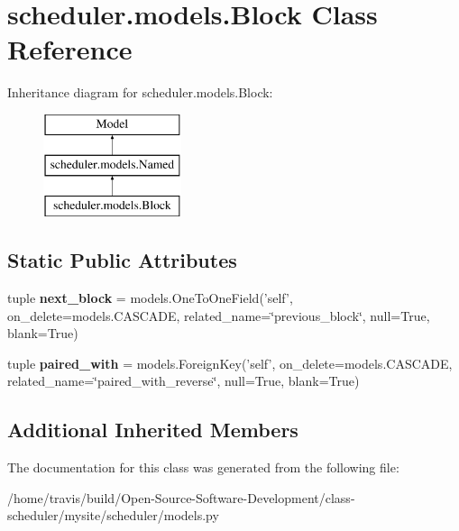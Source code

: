 \hypertarget{classscheduler_1_1models_1_1_block}{\section{scheduler.\-models.\-Block Class Reference}
\label{classscheduler_1_1models_1_1_block}
}
Inheritance diagram for scheduler.\-models.\-Block\-:\begin{figure}[H]
\begin{center}
\leavevmode
\includegraphics[height=3.000000cm]{classscheduler_1_1models_1_1_block}
\end{center}
\end{figure}
\subsection*{Static Public Attributes}
\begin{DoxyCompactItemize}
\item 
\hypertarget{classscheduler_1_1models_1_1_block_ab78204367b89bd16c9cb000d6bc8ecc6}{tuple {\bfseries next\-\_\-block} = models.\-One\-To\-One\-Field('self', on\-\_\-delete=models.\-C\-A\-S\-C\-A\-D\-E, related\-\_\-name=\char`\"{}previous\-\_\-block\char`\"{}, null=True, blank=True)}\label{classscheduler_1_1models_1_1_block_ab78204367b89bd16c9cb000d6bc8ecc6}

\item 
\hypertarget{classscheduler_1_1models_1_1_block_aa869281bbcdb191ddc5c0ed335e63109}{tuple {\bfseries paired\-\_\-with} = models.\-Foreign\-Key('self', on\-\_\-delete=models.\-C\-A\-S\-C\-A\-D\-E, related\-\_\-name=\char`\"{}paired\-\_\-with\-\_\-reverse\char`\"{}, null=True, blank=True)}\label{classscheduler_1_1models_1_1_block_aa869281bbcdb191ddc5c0ed335e63109}

\end{DoxyCompactItemize}
\subsection*{Additional Inherited Members}


The documentation for this class was generated from the following file\-:\begin{DoxyCompactItemize}
\item 
/home/travis/build/\-Open-\/\-Source-\/\-Software-\/\-Development/class-\/scheduler/mysite/scheduler/models.\-py\end{DoxyCompactItemize}
